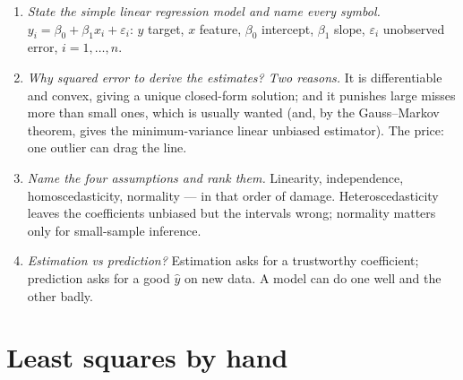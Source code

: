 \documentclass[11pt]{article}
\begin{document}
\begin{concept}
\begin{enumerate}[label=\textbf{C17.\arabic*}]
  \item \emph{State the simple linear regression model and name every
    symbol.} $y_i = \beta_0 + \beta_1x_i + \varepsilon_i$: $y$ target, $x$
    feature, $\beta_0$ intercept, $\beta_1$ slope, $\varepsilon_i$ unobserved
    error, $i = 1,\dots,n$.
  \item \emph{Why squared error to derive the estimates? Two reasons.} It is
    differentiable and convex, giving a unique closed-form solution; and it
    punishes large misses more than small ones, which is usually wanted (and,
    by the Gauss--Markov theorem, gives the minimum-variance linear unbiased
    estimator). The price: one outlier can drag the line.
  \item \emph{Name the four assumptions and rank them.} Linearity,
    independence, homoscedasticity, normality --- in that order of damage.
    Heteroscedasticity leaves the coefficients unbiased but the intervals
    wrong; normality matters only for small-sample inference.
  \item \emph{Estimation vs prediction?} Estimation asks for a trustworthy
    coefficient; prediction asks for a good $\hat y$ on new data. A model can
    do one well and the other badly.
\end{enumerate}
\end{concept}

\section{Least squares by hand}
\label{sec:ls}
\end{document}
